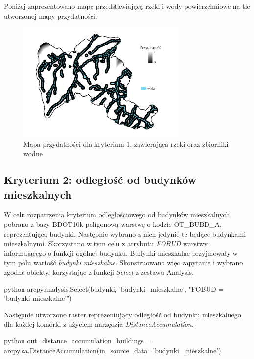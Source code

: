 \documentclass{article}
\begin{document}
Poniżej zaprezentowano mapę przedstawiającą rzeki i wody powierzchniowe na tle utworzonej mapy przydatności.

\begin{figure}[H]
    \centering
    \includegraphics[width=0.75\textwidth]{img/kryterium1-woda.jpg}
    \caption{Mapa przydatności dla kryterium 1. zawierająca rzeki oraz zbiorniki wodne}
\end{figure}
\vspace{10pt}

\subsection{Kryterium 2: odległość od budynków mieszkalnych}
W celu rozpatrzenia kryterium odległościowego od budynków mieszkalnych, pobrano z bazy BDOT10k poligonową warstwę o kodzie OT\_BUBD\_A, reprezentującą budynki. Następnie wybrano z nich jedynie te będące budynkami mieszkalnymi. Skorzystano w tym celu z atrybutu \textit{FOBUD} warstwy, informującego o funkcji ogólnej budynku. Budynki mieszkalne przyjmowały w tym polu wartość \textit{budynki mieszkalne}. Skonstruowano więc zapytanie i wybrano zgodne obiekty, korzystając z funkcji \textit{Select} z zestawu {Analysis}.
\vspace{5pt}

\begin{mintedbox}{python}
arcpy.analysis.Select(budynki, 'budynki_mieszkalne', "FOBUD = 'budynki mieszkalne'")
\end{mintedbox}
\vspace{10pt}

Następnie utworzono raster reprezentujący odległość od budynku mieszkalnego dla każdej komórki z użyciem narzędzia \textit{DistanceAccumulation}.
\vspace{5pt}

\begin{mintedbox}{python}
out_distance_accumulation_buildings = arcpy.sa.DistanceAccumulation(in_source_data='budynki_mieszkalne')
\end{mintedbox}
\vspace{10pt}
\end{document}
